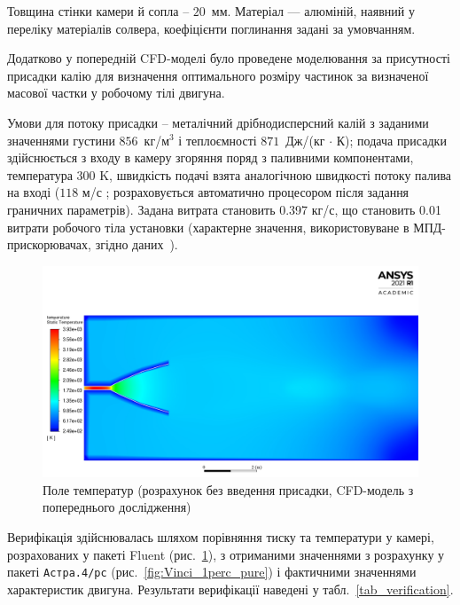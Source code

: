 Товщина стінки камери й сопла -- $20$~мм. Матеріал --- алюміній, наявний у переліку матеріалів солвера, коефіцієнти поглинання задані за умовчанням.

Додатково у попередній CFD-моделі було проведене моделювання за присутності присадки калію для визначення оптимального розміру частинок за визначеної масової частки у робочому тілі двигуна.

Умови для потоку присадки -- металічний дрібнодисперсний калій з заданими значеннями густини $ 856 $~кг/м$^3$ і теплоємності $871$~Дж/(кг $\cdot$ К); подача присадки здійснюється з входу в камеру згоряння поряд з паливними компонентами, температура 300 K, швидкість подачі взята аналогічною швидкості потоку палива на вході ($118$ м/с ; розраховується автоматично процесором після задання граничних параметрів). Задана витрата становить 0.397 кг/с, що становить 0.01 витрати робочого тіла установки (характерне значення, використовуване в МПД-прискорювачах, згідно даних~\cite{Panchenko}).

\begin{figure}
	\centering
	\includegraphics[width=0.7\textheight, angle=0,origin=c]{chapter_3/pure_temperature.jpg}
	\caption{Поле температур (розрахунок без введення присадки, CFD-модель з попереднього дослідження)~\cite{Previous}}
	\label{fig:pure_temperature}
\end{figure}

Верифікація здійснювалась шляхом порівняння тиску та температури у камері, розрахованих у пакеті Fluent (рис.~\ref{fig:pure_temperature}), з отриманими значеннями з розрахунку у пакеті \texttt{Астра.4/рс} (рис.~\ref{fig:Vinci_1perc_pure}) і фактичними значеннями характеристик двигуна. Результати верифікації наведені у табл.~\ref{tab_verification}.

